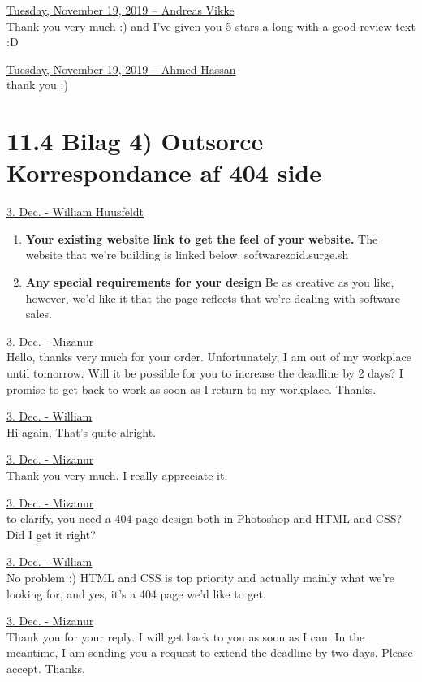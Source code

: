 \documentclass[11pt]{report}
\begin{document}
\noindent\underline{Tuesday, November 19, 2019 – Andreas Vikke}\\
\noindent Thank you very much :) and I've given you 5 stars a long with a good review text :D

\noindent\underline{Tuesday, November 19, 2019 – Ahmed Hassan}\\
\noindent thank you :)


\newpage
\section*{11.4 Bilag 4) Outsorce Korrespondance af 404 side}

\noindent\underline{3. Dec. - William Huusfeldt}
\begin{enumerate}
\item \textbf{Your existing website link to get the feel of your website.}
The website that we're building is linked below.
softwarezoid.surge.sh
\item \textbf{Any special requirements for your design}
Be as creative as you like, however, we'd like it that the page reflects that we're dealing with software sales.
\end{enumerate}

\noindent\underline{3. Dec. - Mizanur}\\
\noindent Hello, thanks very much for your order. Unfortunately, I am out of my workplace until tomorrow. Will it be possible for you to increase the deadline by 2 days? I promise to get back to work as soon as I return to my workplace. Thanks.

\noindent\underline{3. Dec. - William}\\
\noindent Hi again, That's quite alright.

\noindent\underline{3. Dec. - Mizanur}\\
\noindent Thank you very much. I really appreciate it.

\noindent\underline{3. Dec. - Mizanur}\\
\noindent to clarify, you need a 404 page design both in Photoshop and HTML and CSS? 
\noindent Did I get it right?

\noindent\underline{3. Dec. - William}\\
\noindent No problem :)
\noindent HTML and CSS is top priority and actually mainly what we're looking for, and yes, it's a 404 page we'd like to get.

\noindent\underline{3. Dec. - Mizanur}\\
\noindent Thank you for your reply. I will get back to you as soon as I can. In the meantime, I am sending you a request to extend the deadline by two days. Please accept. Thanks.
\end{document}
